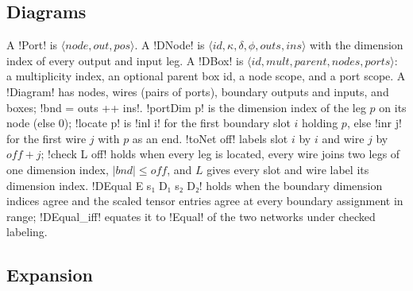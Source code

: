 {\subsection{Diagrams}

A \lbx!Port! is $\langle\mathit{node},\mathit{out},\mathit{pos}\rangle$. A \lbx!DNode! is $\langle\mathit{id},\kappa,\delta,\phi,\mathit{outs},\mathit{ins}\rangle$ with the dimension index of every output and input leg. A \lbx!DBox! is $\langle\mathit{id},\mathit{mult},\mathit{parent},\mathit{nodes},\mathit{ports}\rangle$: a multiplicity index, an optional parent box id, a node scope, and a port scope. A \lbx!Diagram! has nodes, wires (pairs of ports), boundary outputs and inputs, and boxes; \lbx!bnd = outs ++ ins!. \lbx!portDim p! is the dimension index of the leg $p$ on its node (else $0$); \lbx!locate p! is \lbx!inl i! for the first boundary slot $i$ holding $p$, else \lbx!inr j! for the first wire $j$ with $p$ as an end. \lbx!toNet off! labels slot $i$ by $i$ and wire $j$ by $\mathit{off}+j$; \lbx!check L off! holds when every leg is located, every wire joins two legs of one dimension index, $|\mathit{bnd}|\le\mathit{off}$, and $L$ gives every slot and wire label its dimension index. \lbx!DEqual E s₁ D₁ s₂ D₂! holds when the boundary dimension indices agree and the scaled tensor entries agree at every boundary assignment in range; \lbx!DEqual_iff! equates it to \lbx!Equal! of the two networks under checked labeling.

\subsection{Expansion}\label{sec:boxes-recall-expand}

}
